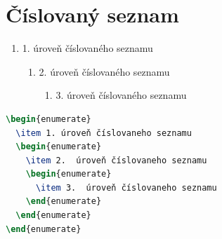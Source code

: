 \section{Číslovaný seznam}

\begin{enumerate}
  \item 1. úroveň číslovaného seznamu
  \begin{enumerate}
    \item 2.  úroveň číslovaného seznamu
    \begin{enumerate}
      \item 3.  úroveň číslovaného seznamu
    \end{enumerate}
  \end{enumerate}
\end{enumerate}

\begin{lstlisting}[caption={Příklad vložení číslovaného seznamu},label=list:8-6,captionpos=t,abovecaptionskip=-\medskipamount,belowcaptionskip=\medskipamount,language=TeX]
\begin{enumerate}
  \item 1. úroveň číslovaneho seznamu
  \begin{enumerate}
    \item 2.  úroveň číslovaneho seznamu
    \begin{enumerate}
      \item 3.  úroveň číslovaneho seznamu
    \end{enumerate}
  \end{enumerate}
\end{enumerate}
\end{lstlisting}

\clearpage


